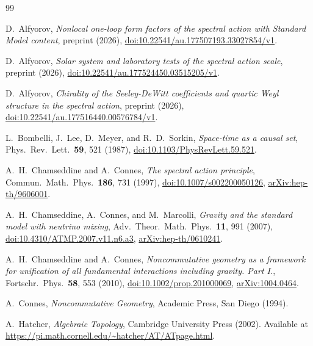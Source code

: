 \documentclass[11pt,a4paper]{article}
\theoremstyle{plain}
\theoremstyle{definition}
\theoremstyle{remark}
\begin{document}
\begin{thebibliography}{99}

D.~Alfyorov,
\emph{Nonlocal one-loop form factors of the spectral action with Standard
Model content},
preprint (2026),
\href{https://doi.org/10.22541/au.177507193.33027854/v1}{doi:10.22541/au.177507193.33027854/v1}.

D.~Alfyorov,
\emph{Solar system and laboratory tests of the spectral action scale},
preprint (2026),
\href{https://doi.org/10.22541/au.177524450.03515205/v1}{doi:10.22541/au.177524450.03515205/v1}.

D.~Alfyorov,
\emph{Chirality of the Seeley-DeWitt coefficients and quartic Weyl structure
in the spectral action},
preprint (2026),
\href{https://doi.org/10.22541/au.177516440.00576784/v1}{doi:10.22541/au.177516440.00576784/v1}.

L.~Bombelli, J.~Lee, D.~Meyer, and R.~D.~Sorkin,
\emph{Space-time as a causal set},
Phys.\ Rev.\ Lett.\ \textbf{59}, 521 (1987),
\href{https://doi.org/10.1103/PhysRevLett.59.521}{doi:10.1103/PhysRevLett.59.521}.

A.~H.~Chamseddine and A.~Connes,
\emph{The spectral action principle},
Commun.\ Math.\ Phys.\ \textbf{186}, 731 (1997),
\href{https://doi.org/10.1007/s002200050126}{doi:10.1007/s002200050126},
\href{https://arxiv.org/abs/hep-th/9606001}{arXiv:hep-th/9606001}.

A.~H.~Chamseddine, A.~Connes, and M.~Marcolli,
\emph{Gravity and the standard model with neutrino mixing},
Adv.\ Theor.\ Math.\ Phys.\ \textbf{11}, 991 (2007),
\href{https://doi.org/10.4310/ATMP.2007.v11.n6.a3}{doi:10.4310/ATMP.2007.v11.n6.a3},
\href{https://arxiv.org/abs/hep-th/0610241}{arXiv:hep-th/0610241}.

A.~H.~Chamseddine and A.~Connes,
\emph{Noncommutative geometry as a framework for unification of all
fundamental interactions including gravity. Part I.},
Fortschr.\ Phys.\ \textbf{58}, 553 (2010),
\href{https://doi.org/10.1002/prop.201000069}{doi:10.1002/prop.201000069},
\href{https://arxiv.org/abs/1004.0464}{arXiv:1004.0464}.

A.~Connes,
\emph{Noncommutative Geometry},
Academic Press, San Diego (1994).

A.~Hatcher,
\emph{Algebraic Topology},
Cambridge University Press (2002).
Available at \url{https://pi.math.cornell.edu/~hatcher/AT/ATpage.html}.


\end{thebibliography}
\end{document}
